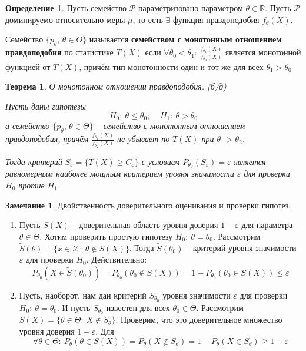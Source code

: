 \documentclass[a4paper,12pt]{article}
\renewcommand{\leq}{\ensuremath{\leqslant}}
\renewcommand{\geq}{\ensuremath{\geqslant}}
\theoremstyle{plain}
\newtheorem{theorem}{Теорема}[section]
\theoremstyle{definition}
\newtheorem{definition}{Определение}[section]
\newtheorem*{note}{Замечание}
\theoremstyle{remark}
\begin{document}
\begin{definition}
  Пусть семейство $\mathcal{P}$ параметризовано параметром $\theta \in \mathbb{R}$. Пусть $\mathcal{P}$ доминируемо относительно меры $\mu$, то есть $\exists$ функция правдоподобия $f_\theta(X)$.

  Семейство $\{p_\theta,\, \theta \in \Theta\}$ называется \textbf{семейством с монотонным отношением правдоподобия} по статистике $T(X)$ если $\forall \theta_0 < \theta_1$: $\frac{f_{\theta_1}(X)}{f_{\theta_0}(X)}$ является монотонной функцией от $T(X)$, причём тип монотонности один и тот же для всех $\theta_1 > \theta_0$ 
\end{definition}

\begin{theorem}
  О монотонном отношении правдоподобия. (б/д)

  Пусть даны гипотезы 
  \[
    H_0 :\: \theta \leq \theta_0;\;\;\;\; H_1 :\: \theta > \theta_0
  \]
  а семейство $\{p_\theta,\, \theta \in \Theta\}$ -- семейство с монотонным отношением правдоподобия, причём $\frac{f_{\theta_1}(X)}{f_{\theta_2}(X)}$ не убывает по $T(X)$ при $\theta_1 > \theta_2$.

  Тогда критерий $S_\varepsilon = \{T(X) \geq C_\varepsilon\}$ с условием $P_{\theta_0}(S_\varepsilon) = \varepsilon$ является равномерным наиболее мощным критерием уровня значимости $\varepsilon$ для проверки $H_0$ против $H_1$.
\end{theorem}

\begin{note}
  Двойственность доверительного оценивания и проверки гипотез.

  \begin{enumerate}
    \item Пусть $S(X)$ -- доверительная область уровня доверия $1 - \varepsilon$ для параметра $\theta \in \Theta$. Хотим проверить простую гипотезу $H_0 :\: \theta = \theta_0$. Рассмотрим $\tilde{S}(\theta) = \{x \in \mathcal{X} :\: \theta \not\in S(X)\}$. Тогда $\tilde{S}(\theta_0)$ -- критерий уровня значимости $\varepsilon$ для проверки $H_0$. Действительно:
    \[
      P_{\theta_0}(X \in \tilde{S}(\theta_0)) = P_{\theta_0}(\theta_0 \not\in S(X)) = 1 - P_{\theta_0}(\theta_0 \in S(X)) \leq \varepsilon
    \]
    \item Пусть, наоборот, нам дан критерий $S_{\theta_0}$ уровня значимости $\varepsilon$ для проверки $H_0 :\: \theta = \theta_0$. И пусть $S_{\theta_0}$ известен для всех $\theta_0 \in \Theta$. Рассмотрим $S(X) = \{\theta \in \Theta :\: X \not\in S_{\theta}\}$. Проверим, что это доверительное множество уровня доверия $1 - \varepsilon$. Для
    \[
      \forall \theta \in \Theta :\: P_\theta(\theta \in S(X)) = P_\theta(X \not\in S_\theta) = 1 - P_\theta(X \in S_\theta) \geq 1 - \varepsilon
    \]
  \end{enumerate}
\end{note}
\end{document}
